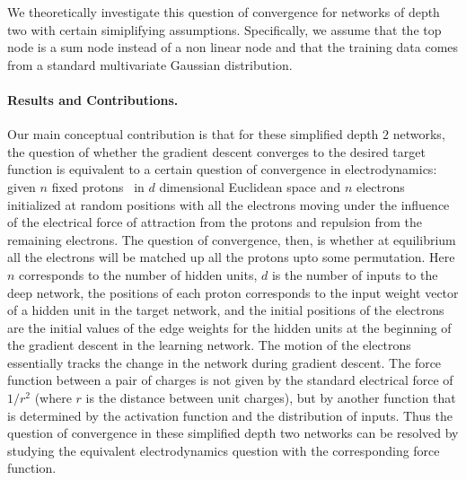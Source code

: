 We theoretically investigate this question of convergence for networks of depth two with certain simiplifying assumptions. Specifically, we assume that the top node is a sum node instead of a non linear node and that the training data comes from a standard multivariate Gaussian distribution. 



\paragraph{Results and Contributions.} Our main conceptual contribution is that for these simplified depth $2$ networks, the question of whether the gradient descent converges to the desired target function is equivalent to a certain question of convergence in electrodynamics: given $n$ fixed protons~ in $d$ dimensional Euclidean space and $n$ electrons initialized at random positions with all the electrons moving under the influence of the electrical force of attraction from the protons and repulsion from the remaining electrons. The question of convergence, then, is whether at equilibrium all the electrons will be matched up all the protons upto some permutation. Here $n$ corresponds to the number of hidden units, $d$ is the number of inputs to the deep network, the positions of each proton corresponds to the input weight vector of
a hidden unit in the target network, and the initial positions of the electrons are the initial values of the edge weights for the hidden units at the beginning of the gradient descent in the learning network. The motion of the electrons essentially tracks the change in the network during gradient descent. The force function between a pair of charges is not given by the standard electrical force of $1/r^2$ (where $r$ is the distance between unit charges), but by another function that is determined by the activation function and the distribution of inputs. Thus the question of convergence in these simplified depth two networks can be resolved by studying the equivalent electrodynamics question with the corresponding force function.
%
